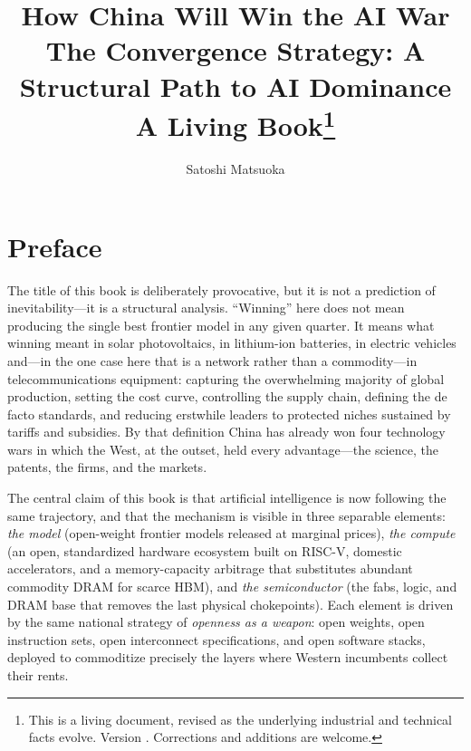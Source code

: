 \documentclass[11pt,a4paper,oneside]{book}
\title{\textbf{\Huge How China Will Win the AI War}\\[6mm]
\Large The Convergence Strategy: A Structural Path to AI Dominance\\[4mm]
\normalsize A Living Book\thanks{This is a living document, revised as the underlying industrial and technical facts evolve. Version \bookversion. Corrections and additions are welcome.}}
\author{Satoshi Matsuoka}
\date{\bookversion}
\begin{document}
\frontmatter
\maketitle

\chapter*{Preface}

The title of this book is deliberately provocative, but it is not a prediction of inevitability---it is a structural analysis. ``Winning'' here does not mean producing the single best frontier model in any given quarter. It means what winning meant in solar photovoltaics, in lithium-ion batteries, in electric vehicles and---in the one case here that is a network rather than a commodity---in telecommunications equipment: capturing the overwhelming majority of global production, setting the cost curve, controlling the supply chain, defining the de facto standards, and reducing erstwhile leaders to protected niches sustained by tariffs and subsidies. By that definition China has already won four technology wars in which the West, at the outset, held every advantage---the science, the patents, the firms, and the markets.

The central claim of this book is that artificial intelligence is now following the same trajectory, and that the mechanism is visible in three separable elements: \emph{the model} (open-weight frontier models released at marginal prices), \emph{the compute} (an open, standardized hardware ecosystem built on RISC-V, domestic accelerators, and a memory-capacity arbitrage that substitutes abundant commodity DRAM for scarce HBM), and \emph{the semiconductor} (the fabs, logic, and DRAM base that removes the last physical chokepoints). Each element is driven by the same national strategy of \emph{openness as a weapon}: open weights, open instruction sets, open interconnect specifications, and open software stacks, deployed to commoditize precisely the layers where Western incumbents collect their rents.
\end{document}
